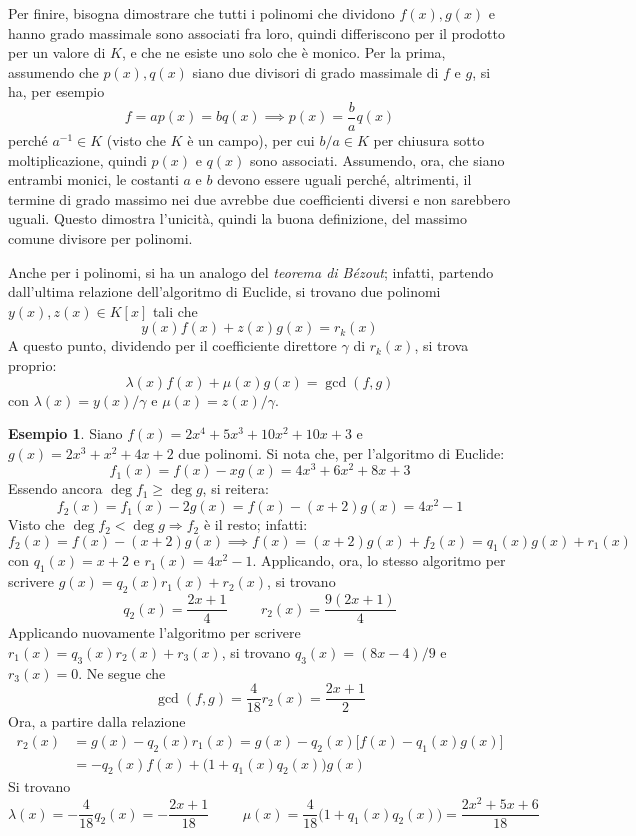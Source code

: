 \documentclass[11pt, a4paper]{scrartcl}
\theoremstyle{definition}
\newtheorem{esempio}{Esempio}
\numberwithin{esempio}{section}
\theoremstyle{definition}
\numberwithin{obs}{section}
\numberwithin{nota}{section}
\numberwithin{equation}{subsection}
\begin{document}
Per finire, bisogna dimostrare che tutti i polinomi che dividono $f(x),g(x)$ e hanno grado massimale sono associati fra loro, quindi differiscono per il prodotto per un valore di $K$, e che ne esiste uno solo che \`e monico.
Per la prima, assumendo che $p(x),q(x)$ siano due divisori di grado massimale di $f$ e $g$, si ha, per esempio
\[
	f = a p(x) = bq(x) \implies p(x) = \frac{b}{a}q(x)
\] 
perch\'e $a^{-1} \in K$ (visto che $K$ \`e un campo), per cui $b / a \in K$ per chiusura sotto moltiplicazione, quindi $p(x)$ e $q(x)$ sono associati. Assumendo, ora, che siano entrambi monici, le costanti $a$ e $b$ devono essere uguali perch\'e, altrimenti, il termine di grado massimo nei due avrebbe due coefficienti diversi e non sarebbero uguali.
Questo dimostra l'unicit\`a, quindi la buona definizione, del massimo comune divisore per polinomi.

Anche per i polinomi, si ha un analogo del \textit{teorema di B\'ezout}; infatti, partendo dall'ultima relazione dell'algoritmo di Euclide, si trovano due polinomi $y(x), z(x) \in K[x]$ tali che 
\[
y(x) f(x) + z(x) g(x) = r_k(x)
\] 
A questo punto, dividendo per il coefficiente direttore $\gamma$ di $r_k(x)$, si trova proprio:
\begin{equation}
	\lambda (x) f(x) + \mu (x) g(x) = \operatorname{gcd}(f,g) 
\end{equation}
con $\lambda (x) = y (x) / \gamma$ e $\mu (x) = z(x) / \gamma$.
\begin{esempio}
Siano $f(x) = 2x^4 + 5x^3 + 10x^2 + 10x + 3$ e $g(x) = 2x^3 + x^2 + 4x + 2$ due polinomi.
Si nota che, per l'algoritmo di Euclide:
\[
f_1(x) = f(x) - xg(x) = 4x^3 + 6x^2 + 8x +3
\] 
Essendo ancora $\operatorname{deg} f_1\ge  \operatorname{deg} g$, si reitera:
\[
f_2(x) = f_1 (x) - 2g(x) = f(x) - (x+2)g(x) = 4x^2 - 1
\] 
Visto che $\operatorname{deg} f_2 < \operatorname{deg} g\Rightarrow f_2$ \`e il resto; infatti:
\[
f_2(x) = f(x) - (x+2) g(x) \implies f(x) = (x+2)g(x) + f_2(x) = q_1(x) g(x) + r_1(x)
\] 
con $q_1(x) = x+2$ e $r_1(x) = 4x^2 -1$.
Applicando, ora, lo stesso algoritmo per scrivere $g(x) = q_2(x)r_1(x) + r_2(x)$, si trovano
\[
q_2(x) = \frac{2x+1}{4}\hspace{1cm}r_2(x) = \frac{9(2x+1)}{4}
\] 
Applicando nuovamente l'algoritmo per scrivere $r_1(x) = q_3(x)r_2(x) + r_3(x)$, si trovano $q_3(x) = (8x-4) / 9$ e $r_3(x) = 0$.
Ne segue che
\[
	\operatorname{gcd}(f,g) = \frac{4}{18}r_2(x) = \frac{2x+1}{2}
\] 
Ora, a partire dalla relazione
\[
	\begin{split}
		r_2(x) &= g(x) - q_2(x) r_1(x) = g(x) - q_2(x) \big[ f(x) - q_1(x) g(x) \big] \\
		       &=-q_2(x) f(x) + \big(1+q_1(x) q_2(x)\big) g(x)
	\end{split}
\] 
Si trovano
\[
\lambda (x) = -\frac{4}{18}q_2(x) = - \frac{2x+1}{18} \hspace{1cm} \mu (x) =\frac{4}{18}\big(1+q_1(x) q_2(x)\big)=\frac{2x^2 + 5x + 6}{18}
\] 
\end{esempio}
\end{document}

